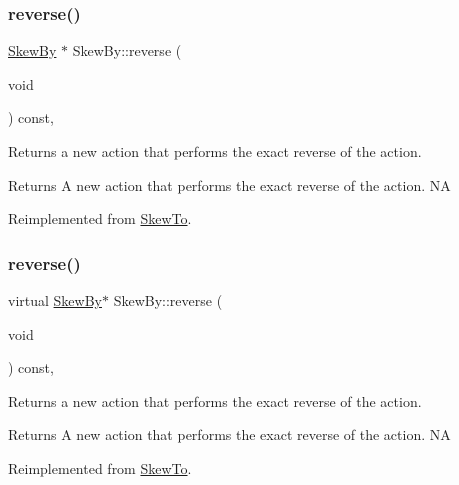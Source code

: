 \subsubsection{\texorpdfstring{reverse()}{reverse()}\hspace{0.1cm}{\footnotesize\ttfamily [1/2]}}
{\footnotesize\ttfamily \hyperlink{classSkewBy}{Skew\+By} $\ast$ Skew\+By\+::reverse (\begin{DoxyParamCaption}\item[{void}]{ }\end{DoxyParamCaption}) const\hspace{0.3cm}{\ttfamily [override]}, {\ttfamily [virtual]}}

Returns a new action that performs the exact reverse of the action.

\begin{DoxyReturn}{Returns}
A new action that performs the exact reverse of the action.  NA 
\end{DoxyReturn}


Reimplemented from \hyperlink{classSkewTo_a4e35b4a1e7572f0c74c8d7684f02f3fd}{Skew\+To}.

\mbox{\label{classSkewBy_aab134941d72a83d6249553e8e772da35}} 
\subsubsection{\texorpdfstring{reverse()}{reverse()}\hspace{0.1cm}{\footnotesize\ttfamily [2/2]}}
{\footnotesize\ttfamily virtual \hyperlink{classSkewBy}{Skew\+By}$\ast$ Skew\+By\+::reverse (\begin{DoxyParamCaption}\item[{void}]{ }\end{DoxyParamCaption}) const\hspace{0.3cm}{\ttfamily [override]}, {\ttfamily [virtual]}}

Returns a new action that performs the exact reverse of the action.

\begin{DoxyReturn}{Returns}
A new action that performs the exact reverse of the action.  NA 
\end{DoxyReturn}


Reimplemented from \hyperlink{classSkewTo_a4e35b4a1e7572f0c74c8d7684f02f3fd}{Skew\+To}.

\mbox{\label{classSkewBy_a8f9601dbf00d1a79972bcef59201bd32}} 
